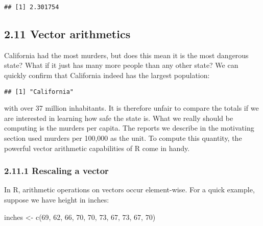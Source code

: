 \documentclass[
]{article}
\newenvironment{Shaded}{\begin{snugshade}}{\end{snugshade}}
\newcommand{\DecValTok}[1]{\textcolor[rgb]{0.00,0.00,0.81}{#1}}
\newcommand{\FunctionTok}[1]{\textcolor[rgb]{0.00,0.00,0.00}{#1}}
\newcommand{\NormalTok}[1]{#1}
\newcommand{\OtherTok}[1]{\textcolor[rgb]{0.56,0.35,0.01}{#1}}
\newcommand{\SpecialCharTok}[1]{\textcolor[rgb]{0.00,0.00,0.00}{#1}}
\newcommand{\StringTok}[1]{\textcolor[rgb]{0.31,0.60,0.02}{#1}}
\begin{document}
\begin{verbatim}
## [1] 2.301754
\end{verbatim}

\hypertarget{vector-arithmetics}{%
\subsection{2.11 Vector arithmetics}\label{vector-arithmetics}}

California had the most murders, but does this mean it is the most
dangerous state? What if it just has many more people than any other
state? We can quickly confirm that California indeed has the largest
population:

\begin{Shaded}
\end{Shaded}

\begin{verbatim}
## [1] "California"
\end{verbatim}

with over 37 million inhabitants. It is therefore unfair to compare the
totals if we are interested in learning how safe the state is. What we
really should be computing is the murders per capita. The reports we
describe in the motivating section used murders per 100,000 as the unit.
To compute this quantity, the powerful vector arithmetic capabilities of
R come in handy.

\hypertarget{rescaling-a-vector}{%
\subsubsection{2.11.1 Rescaling a vector}\label{rescaling-a-vector}}

In R, arithmetic operations on vectors occur element-wise. For a quick
example, suppose we have height in inches:

\begin{Shaded}
\begin{Highlighting}[]
\NormalTok{inches }\OtherTok{\textless{}{-}} \FunctionTok{c}\NormalTok{(}\DecValTok{69}\NormalTok{, }\DecValTok{62}\NormalTok{, }\DecValTok{66}\NormalTok{, }\DecValTok{70}\NormalTok{, }\DecValTok{70}\NormalTok{, }\DecValTok{73}\NormalTok{, }\DecValTok{67}\NormalTok{, }\DecValTok{73}\NormalTok{, }\DecValTok{67}\NormalTok{, }\DecValTok{70}\NormalTok{)}
\end{Highlighting}
\end{Shaded}
\end{document}
